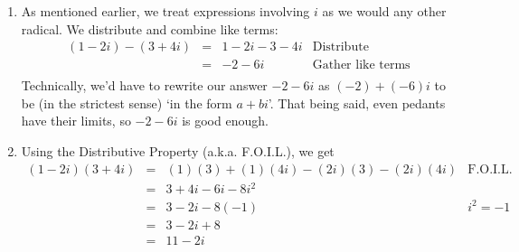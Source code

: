 \documentclass{ximera}
\begin{document}
\begin{exampleSol}
    \begin{enumerate}
        \item  As mentioned earlier, we treat expressions involving $i$ as we would any other radical. We distribute and combine like terms:
        \[ 
            \begin{array}{rclr}
            (1-2i) - (3+4i) & = &  1-2i-3-4i & \text{Distribute} \\
                            & = &  -2 - 6i & \text{Gather like terms} \\
            \end{array}
        \] 
        Technically, we'd have to rewrite our answer  $-2-6i$ as $(-2) + (-6)i$ to be (in the strictest sense) `in the form $a+bi$'. That being said, even pedants have their limits, so $-2-6i$ is good enough.
        
        \item  Using the Distributive Property (a.k.a. F.O.I.L.), we get 
        \[ 
            \begin{array}{rclr}
            (1-2i)(3+4i) & = & (1)(3) + (1)(4i) - (2i)(3) - (2i)(4i) & \text{F.O.I.L.} \\
                         & = & 3+4i-6i-8i^2 & \\
            			 & = & 3 - 2i - 8(-1) & \text{$i^2=-1$} \\
            			 & = & 3 - 2i + 8 & \\
            			 & = & 11 - 2i & \\ 
            \end{array}
        \]
        

\end{enumerate}
\end{exampleSol}
\end{document}
